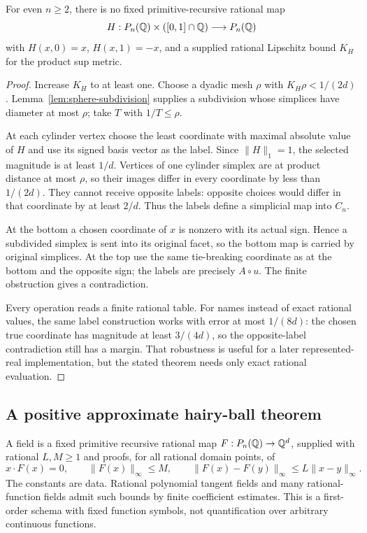 \begin{theorem}\label{thm:no-antipodal-homotopy}
For even $n\geq2$, there is no fixed primitive-recursive rational map
\[
 H:P_n(\mathbb Q)\times([0,1]\cap\mathbb Q)\longrightarrow P_n(\mathbb Q)
\]
with $H(x,0)=x$, $H(x,1)=-x$, and a supplied rational Lipschitz bound $K_H$ for the product sup metric.
\end{theorem}
\begin{proof}
Increase $K_H$ to at least one. Choose a dyadic mesh $\rho$ with
$K_H\rho<1/(2d)$. Lemma~\ref{lem:sphere-subdivision} supplies a subdivision whose simplices have diameter at most $\rho$; take $T$ with $1/T\leq\rho$.

At each cylinder vertex choose the least coordinate with maximal absolute value of $H$ and use its signed basis vector as the label. Since $\|H\|_1=1$, the selected magnitude is at least $1/d$. Vertices of one cylinder simplex are at product distance at most $\rho$, so their images differ in every coordinate by less than $1/(2d)$. They cannot receive opposite labels: opposite choices would differ in that coordinate by at least $2/d$. Thus the labels define a simplicial map into $C_n$.

At the bottom a chosen coordinate of $x$ is nonzero with its actual sign. Hence a subdivided simplex is sent into its original facet, so the bottom map is carried by original simplices. At the top use the same tie-breaking coordinate as at the bottom and the opposite sign; the labels are precisely $A\circ u$. The finite obstruction gives a contradiction.

Every operation reads a finite rational table. For names instead of exact rational values, the same label construction works with error at most $1/(8d)$: the chosen true coordinate has magnitude at least $3/(4d)$, so the opposite-label contradiction still has a margin. That robustness is useful for a later represented-real implementation, but the stated theorem needs only exact rational evaluation.
\end{proof}

\subsection{A positive approximate hairy-ball theorem}

\begin{definition}
A field is a fixed primitive recursive rational map
$F:P_n(\mathbb Q)\to\mathbb Q^d$, supplied with rational $L,M\geq1$ and proofs, for all rational domain points, of
\[
 x\cdot F(x)=0,\qquad
 \|F(x)\|_\infty\leq M,\qquad
 \|F(x)-F(y)\|_\infty\leq L\|x-y\|_\infty.
\]
The constants are data. Rational polynomial tangent fields and many rational-function fields admit such bounds by finite coefficient estimates. This is a first-order schema with fixed function symbols, not quantification over arbitrary continuous functions.
\end{definition}

